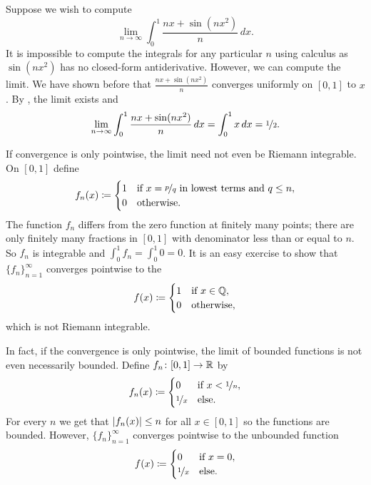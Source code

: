 \begin{example}
Suppose we wish to compute
\begin{equation*}
\lim_{n\to\infty} \int_0^1 \frac{nx+ \sin(nx^2)}{n} \,dx .
\end{equation*}
It is impossible to compute the integrals for any particular $n$ using 
calculus as $\sin(nx^2)$ has no closed-form antiderivative.  However,
we can compute the limit.
We have shown before that $\frac{nx+ \sin(nx^2)}{n}$ converges uniformly
on $[0,1]$ to $x$.
By , the limit exists and
\begin{equation*}
\lim_{n\to\infty} \int_0^1 \frac{nx+ \sin(nx^2)}{n} \,dx
=
\int_0^1
x \,dx = \nicefrac{1}{2} .
\end{equation*}
\end{example}

\begin{example}
If convergence is only pointwise, the limit need not even be Riemann
integrable.  On $[0,1]$ define
\begin{equation*}
f_n(x) \coloneqq
\begin{cases}
1 & \text{if } x = \nicefrac{p}{q} \text{ in lowest terms and } q \leq n, \\
0 & \text{otherwise.}
\end{cases}
\end{equation*}
The function $f_n$ differs from the zero function at finitely many points;
there are only finitely many fractions in $[0,1]$ with denominator less than
or equal to $n$.   So $f_n$ is integrable and $\int_0^1 f_n = \int_0^1 0 =
0$.  It is an easy exercise to show that $\{ f_n \}_{n=1}^\infty$ converges pointwise to the
\begin{equation*}
f(x) \coloneqq
\begin{cases}
1 & \text{if } x \in {\mathbb{Q}}, \\
0 & \text{otherwise,}
\end{cases}
\end{equation*}
which is not Riemann integrable.
\end{example}

\begin{example}
In fact, if the convergence is only pointwise, the limit of bounded
functions is not even necessarily bounded.
Define $f_n \colon [0,1] \to {\mathbb{R}}$ by
\begin{equation*}
f_n(x) \coloneqq
\begin{cases}
0 & \text{if } x < \nicefrac{1}{n},\\
\nicefrac{1}{x} & \text{else.}
\end{cases}
\end{equation*}
For every $n$ we get that $\left\lvert {f_n(x)} \right\rvert \leq n$ for all $x \in [0,1]$ so the
functions are bounded.  However, $\{ f_n \}_{n=1}^\infty$ converges pointwise to
the unbounded function
\begin{equation*}
f(x) \coloneqq
\begin{cases}
0 & \text{if } x = 0,\\
\nicefrac{1}{x} & \text{else.}
\end{cases}
\end{equation*}
\end{example}


